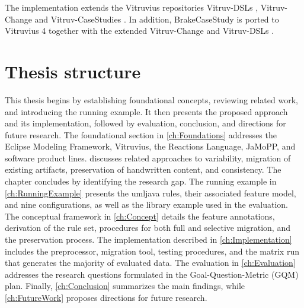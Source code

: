 The implementation extends the Vitruvius repositories Vitruv-DSLs \cite{vitruv-dsls-fork}, Vitruv-Change \cite{vitruv-change-fork} and Vitruv-CaseStudies \cite{vitruv-casestudies-fork}.
In addition, BrakeCaseStudy is ported to Vitruvius 4 together with the extended Vitruv-Change and Vitruv-DSLs \cite{brakecasestudy-fork}.

\section{Thesis structure}
\label{sec:Introduction:ThesisStructure}

This thesis begins by establishing foundational concepts, reviewing related work, and introducing the running example.
It then presents the proposed approach and its implementation, followed by evaluation, conclusion, and directions for future research.
The foundational section in \autoref{ch:Foundations} addresses the Eclipse Modeling Framework, Vitruvius, the Reactions Language, JaMoPP, and software product lines.
 discusses related approaches to variability, migration of existing artifacts, preservation of handwritten content, and consistency.
The chapter concludes by identifying the research gap.
The running example in \autoref{ch:RunningExample} presents the umljava rules, their associated feature model, and nine configurations, as well as the library example used in the evaluation.
The conceptual framework in \autoref{ch:Concept} details the feature annotations, derivation of the rule set, procedures for both full and selective migration, and the preservation process.
The implementation described in \autoref{ch:Implementation} includes the preprocessor, migration tool, testing procedures, and the matrix run that generates the majority of evaluated data.
The evaluation in \autoref{ch:Evaluation} addresses the research questions formulated in the Goal-Question-Metric (GQM) plan.
Finally, \autoref{ch:Conclusion} summarizes the main findings, while \autoref{ch:FutureWork} proposes directions for future research.

